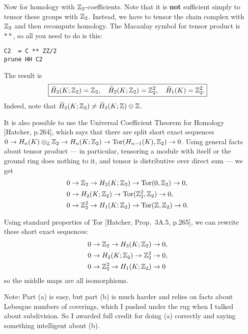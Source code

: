 Now for homology with $\mathbb{Z}_2$-coefficients.  Note that it is \textbf{not} sufficient simply to tensor these groups with $\mathbb{Z}_2$.  Instead, we have to tensor the chain complex with $\mathbb{Z}_2$ and then recompute homology.  The Macaulay symbol for tensor product is $**$, so all you need to do is this:
\begin{verbatim}
C2  = C ** ZZ/2
prune HH C2
\end{verbatim}
The result is
\[\boxed{\tilde H_3(K;\mathbb{Z}_2)=\mathbb{Z}_2, \quad \tilde H_2(K;\mathbb{Z}_2)=\mathbb{Z}_2^2, \quad \tilde H_1(K)=\mathbb{Z}_2^2.}\]
Indeed, note that $\tilde H_2(K;\mathbb{Z}_2)\neq\tilde H_2(K;\mathbb{Z})\otimes\mathbb{Z}$.

It is also possible to use the Universal Coefficient Theorem for Homology [Hatcher, p.264], which says that
there are split short exact sequences
$0\to H_n(K)\otimes_{\mathbb{Z}}\mathbb{Z}_2 \to H_n(K;\mathbb{Z}_2) \to \operatorname{Tor}(H_{n-1}(K),\mathbb{Z}_2) \to 0$.
Using general facts about tensor product --- in particular, tensoring a module with itself or the ground ring does nothing to it, and tensor is distributive over direct sum --- we get
\begin{align*}
0&\to \mathbb{Z}_2 \to H_3(K;\mathbb{Z}_2) \to \operatorname{Tor}(0,\mathbb{Z}_2) \to 0,\\
0&\to H_2(K;\mathbb{Z}_2) \to \operatorname{Tor}(\mathbb{Z}_2^2,\mathbb{Z}_2) \to 0,\\
0&\to \mathbb{Z}_2^2 \to H_1(K;\mathbb{Z}_2) \to \operatorname{Tor}(\mathbb{Z},\mathbb{Z}_2) \to 0.
\end{align*}

Using standard properties of Tor [Hatcher, Prop.~3A.5, p.265], we can rewrite these short exact sequences:
\begin{align*}
0&\to \mathbb{Z}_2 \to H_3(K;\mathbb{Z}_2) \to 0,\\
0&\to H_2(K;\mathbb{Z}_2) \to \mathbb{Z}_2^2 \to 0,\\
0&\to \mathbb{Z}_2^2 \to H_1(K;\mathbb{Z}_2) \to 0
\end{align*}
so the middle maps are all isomorphisms.


Note: Part (a) is easy, but part (b) is much harder and relies on facts about Lebesgue numbers of coverings, which I pushed under the rug when I talked about subdivision.  So I awarded full credit for doing (a) correctly and saying something intelligent about (b).

